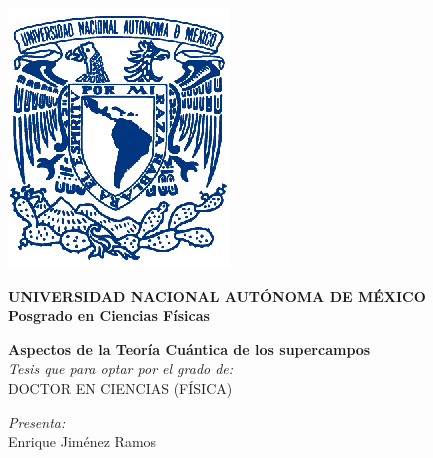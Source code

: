 \begin{titlepage}
   \begin{center}          
   \includegraphics[scale=1.3]{Portada/Escudo_UNAM_eps}
     \large
        \begin{center}   
      {\selectfont
  \textbf{	UNIVERSIDAD NACIONAL AUTÓNOMA DE MÉXICO}\\
     \textbf{ {\color{Blue} 	Posgrado en Ciencias Físicas}}\\
} 
\end{center}  
   \end{center}


        \vspace*{0.6cm}
        \begin{center}
        
      \Huge       
          {\selectfont
        \textbf{Aspectos de la Teoría Cuántica de los supercampos}         
              }          \\
        \vspace{0.8cm}  
        \large
            \textit{ Tesis que para optar por el grado de:}\\
            \vspace{0.15cm}
       {\color{blue}DOCTOR EN CIENCIAS (FÍSICA)}\\
        \vspace{0.8cm} 
      
       \textit{ Presenta:}      \\  
        \vspace{0.25cm}
        \Large
           {\selectfont
       {Enrique Jiménez Ramos}\\
        }
         \vspace{1.0cm}   
         \end{center}       
         \begin{large}         
         {\color{Blue}     
             
}
\end{large}
\end{titlepage}
